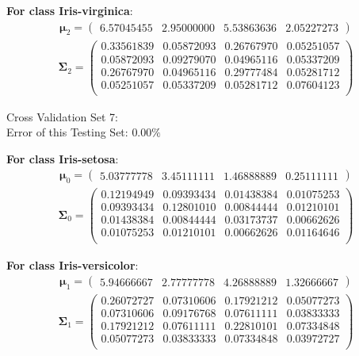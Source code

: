 \documentclass[11pt,a4paper]{article}
\newcommand{\htab}{\hspace*{0.63cm}}
\newcommand{\bs}[1]{\boldsymbol{#1}}
\begin{document}
\textbf{For class Iris-virginica}:
\begin{align} \bs{\mu}_{2} = \begin{pmatrix} 
6.57045455 & 2.95000000 & 5.53863636 & 2.05227273 
 \end{pmatrix}  \end{align} 
\vspace{-1cm}
\begin{align} \bs{\Sigma}_{2} = \begin{pmatrix} 
0.33561839 & 0.05872093 & 0.26767970 & 0.05251057 \\ 
0.05872093 & 0.09279070 & 0.04965116 & 0.05337209 \\ 
0.26767970 & 0.04965116 & 0.29777484 & 0.05281712 \\ 
0.05251057 & 0.05337209 & 0.05281712 & 0.07604123 \\ 
\end{pmatrix} \end{align}

\newpage

Cross Validation Set 7: \\
\htab Error of this Testing Set: $0.00\%$ 

\textbf{For class Iris-setosa}:
\begin{align} \bs{\mu}_{0} = \begin{pmatrix} 
5.03777778 & 3.45111111 & 1.46888889 & 0.25111111 
 \end{pmatrix}  \end{align} 
\vspace{-1cm}
\begin{align} \bs{\Sigma}_{0} = \begin{pmatrix} 
0.12194949 & 0.09393434 & 0.01438384 & 0.01075253 \\ 
0.09393434 & 0.12801010 & 0.00844444 & 0.01210101 \\ 
0.01438384 & 0.00844444 & 0.03173737 & 0.00662626 \\ 
0.01075253 & 0.01210101 & 0.00662626 & 0.01164646 \\ 
\end{pmatrix} \end{align}

\textbf{For class Iris-versicolor}:
\begin{align} \bs{\mu}_{1} = \begin{pmatrix} 
5.94666667 & 2.77777778 & 4.26888889 & 1.32666667 
 \end{pmatrix}  \end{align} 
\vspace{-1cm}
\begin{align} \bs{\Sigma}_{1} = \begin{pmatrix} 
0.26072727 & 0.07310606 & 0.17921212 & 0.05077273 \\ 
0.07310606 & 0.09176768 & 0.07611111 & 0.03833333 \\ 
0.17921212 & 0.07611111 & 0.22810101 & 0.07334848 \\ 
0.05077273 & 0.03833333 & 0.07334848 & 0.03972727 \\ 
\end{pmatrix} \end{align}
\end{document}
